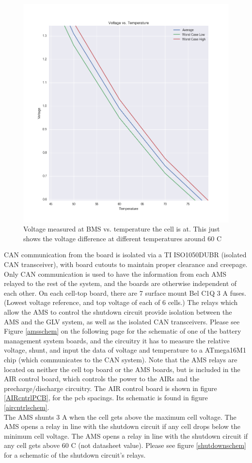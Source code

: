 \documentclass{article}
\begin{document}
        \begin{figure}[H]
        \centering
        \includegraphics[width =0.6 \textwidth]{VoltageVSTempZOOM.png}
        \caption{Voltage measured at BMS vs. temperature the cell is at. This just shows the voltage difference at different temperatures around 60 \degree C}
        \label{fig:voltageCellvsTempZOOM}
        \end{figure}

    CAN communication from the board is isolated via a TI ISO1050DUBR (isolated CAN transceiver), with board cutouts to maintain proper clearance and creepage. Only CAN communication is used to have the information from each AMS relayed to the rest of the system, and the boards are otherwise independent of each other. On each cell-top board, there are 7 surface mount Bel C1Q 3 A fuses. (Lowest voltage reference, and top voltage of each of 6 cells.) The relays which allow the AMS to control the shutdown circuit provide isolation between the AMS and the GLV system, as well as the isolated CAN transceivers. Please see Figure \ref{amsschem} on the following page for the schematic of one of the battery management system boards, and the circuitry it has to measure the relative voltage, shunt, and input the data of voltage and temperature to a ATmega16M1 chip (which communicates to the CAN system). Note that the AMS relays are located on neither the cell top board or the AMS boards, but is included in the AIR control board, which controls the power to the AIRs and the precharge/discharge circuitry. The AIR control board is shown in figure \ref{AIRcntrlPCB}, for the pcb spacings. Its schematic is found in figure \ref{aircntrlschem}.\\

    The AMS shunts 3 A when the cell gets above the maximum cell voltage. The AMS opens a relay in line with the shutdown circuit if any cell drops below the minimum cell voltage. The AMS opens a relay in line with the shutdown circuit if any cell gets above 60 \degree C (not datasheet value). Please see figure \ref{shutdownschem} for a schematic of the shutdown circuit's relays.
\end{document}
